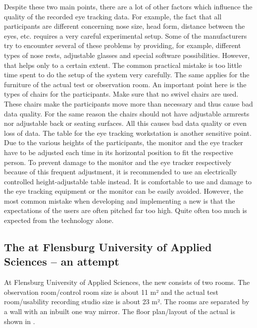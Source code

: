 \documentclass[output=paper]{langsci/langscibook}
\begin{document}
Despite these two main points, there are a lot of other factors which influence the quality of the recorded eye tracking data. For example, the fact that all participants are different concerning nose size, head form, distance between the eyes, etc. requires a very careful experimental setup. Some of the manufacturers try to encounter several of these problems by providing, for example, different types of nose rests, adjustable glasses and special software possibilities. However, that helps only to a certain extent. The common practical mistake is too little time spent to do the setup of the system very carefully. The same applies for the furniture of the actual test or observation room. An important point here is the types of chairs for the participants. Make sure that no swivel chairs are used. These chairs make the participants move more than necessary and thus cause bad data quality. For the same reason the chairs should not have adjustable armrests nor adjustable back or seating surfaces. All this causes bad data quality or even loss of data. The table for the eye tracking workstation is another sensitive point. Due to the various heights of the participants, the monitor and the eye tracker have to be adjusted each time in its horizontal position to fit the respective person. To prevent damage to the monitor and the eye tracker respectively because of this frequent adjustment, it is recommended to use an electrically controlled height-adjustable table instead. It is comfortable to use and damage to the eye tracking equipment or the monitor can be easily avoided. However, the most common mistake when developing and implementing a new  is that the expectations of the users are often pitched far too high. Quite often too much is expected from the technology alone. 


\subsection{The  at Flensburg University of Applied Sciences -- an attempt }

At Flensburg University of Applied Sciences, the new  consists of two rooms. The observation room/control room size is about 11 m² and the actual test room/usability recording studio size is about 23 m². The rooms are separated by a wall with an inbuilt one way mirror. The floor plan/layout of the actual  is shown in . 
\end{document}

